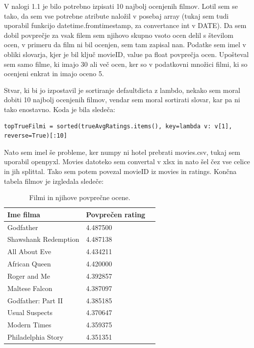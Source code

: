 \documentclass[a4paper,11pt]{article}
\begin{document}
V nalogi 1.1 je bilo potrebno izpisati 10 najbolj ocenjenih filmov. Lotil sem se tako, da sem vse potrebne atribute naložil v posebaj array (tukaj sem tudi uporabil funkcijo datetime.fromtimestamp, za convertance int v DATE). Da sem dobil povprečje za vsak filem sem njihovo skupno vsoto ocen delil s številom ocen, v primeru da film ni bil ocenjen, sem tam zapisal nan. Podatke sem imel v obliki slovarja, kjer je bil ključ movieID, value pa float povprečja ocen. Upošteval sem samo filme, ki imajo 30 ali več ocen, ker so v podatkovni množici filmi, ki so ocenjeni enkrat in imajo oceno 5.

Stvar, ki bi jo izpostavil je sortiranje defaultdicta z lambdo, nekako sem moral dobiti 10 najbolj ocenjenih filmov, vendar sem moral sortirati slovar, kar pa ni tako enostavno. Koda je bila sledeča: 

\begin{lstlisting}
topTrueFilmi = sorted(trueAvgRatings.items(), key=lambda v: v[1], reverse=True)[:10]
\end{lstlisting}

Nato sem imel še probleme, ker numpy ni hotel prebrati movies.csv, tukaj sem uporabil openpyxl. Movies datoteko sem convertal v xlsx in nato šel čez vse celice in jih splittal. Tako sem potem povezal movieID iz movies in ratings. Končna tabela filmov je izgledala sledeče:

\begin{table}[htbp]
	\caption{Filmi in njihove povprečne ocene.}
	\label{tab_genres}
	\begin{center}
		\begin{tabular}{llp{3cm}}
			\hline
			Ime filma & Povprečen rating \\
			\hline
			Godfather            & 4.487500 \\
			Shawshank Redemption & 4.487138 \\  
			All About Eve 		 & 4.434211 \\
			African Queen        & 4.420000 \\
			Roger and Me 		 & 4.392857 \\
			Maltese Falcon       & 4.387097 \\
			Godfather: Part II   & 4.385185 \\
			Usual Suspects       & 4.370647 \\
			Modern Times 		 & 4.359375 \\
			Philadelphia Story   & 4.351351 \\
			\hline
		\end{tabular}
	\end{center}
\end{table}
\pagebreak
\end{document}
